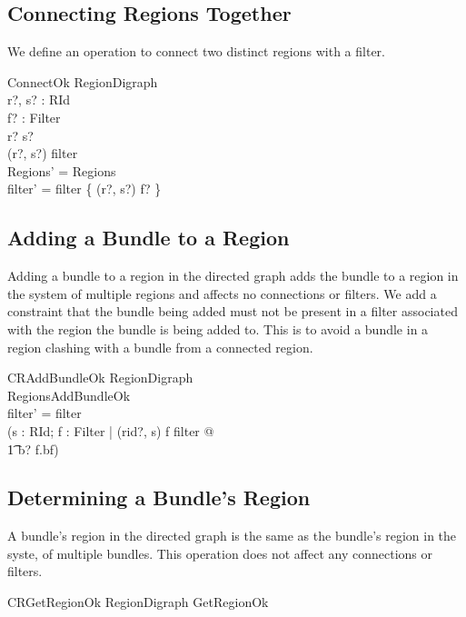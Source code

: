 \documentclass[a4paper,9pt]{article}
\begin{document}
\subsection{Connecting Regions Together}

We define an operation to connect two distinct regions with a filter.
\begin{schema}{ConnectOk}
  \Delta RegionDigraph \\
  r?, s? : RId \\
  f? : Filter \\
\where
  r? \neq s? \\
  (r?, s?) \notin \dom filter \\
  \theta Regions' = \theta Regions \\
  filter' = filter \cup \{ (r?, s?) \mapsto f? \} \\
\end{schema}

\subsection{Adding a Bundle to a Region}

Adding a bundle to a region in the directed graph adds the bundle to a region in the
system of multiple regions and affects no connections or filters.
We add a constraint that the bundle being added must not 
be present in a filter associated with the region the bundle is being added to.
This is to avoid a bundle in a region clashing with a bundle from a connected region.
\begin{schema}{CRAddBundleOk}
  \Delta RegionDigraph \\
  RegionsAddBundleOk \\
\where
  filter' = filter \\
  (\forall s : RId; f : Filter | (rid?, s) \mapsto f \in filter @ \\
\t1 b? \notin f.bf) \\ 
\end{schema}

\subsection{Determining a Bundle's Region}

A bundle's region in the directed graph is the same as the bundle's
region in the syste, of multiple bundles.
This operation does not affect any connections or filters.
\begin{zed}
  CRGetRegionOk  \Xi RegionDigraph \land GetRegionOk \\
\end{zed}
\end{document}
